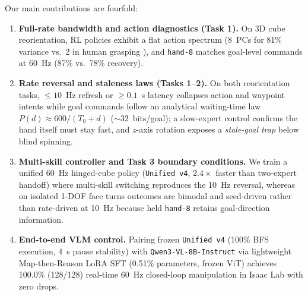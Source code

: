 Our main contributions are fourfold:
\begin{enumerate}[leftmargin=1.5em,itemsep=1.5pt,topsep=2pt]
  \item \textbf{Full-rate bandwidth and action diagnostics (Task 1).} On 3D cube reorientation, RL policies exhibit a flat action spectrum (8~PCs for 81\% variance vs.\ 2 in human grasping \citep{santello1998postural}), and \texttt{hand-8} matches goal-level commands at 60~Hz (87\% vs.\ 78\% recovery).
  \item \textbf{Rate reversal and staleness laws (Tasks 1--2).} On both reorientation tasks, $\le 10$~Hz refresh or $\ge 0.1$~s latency collapses action and waypoint intents while goal commands follow an analytical waiting-time law $P(d)\approx 600/(T_0+d)$ ($\sim 32$~bits/goal); a slow-expert control confirms the hand itself must stay fast, and $z$-axis rotation exposes a \emph{stale-goal trap} below blind spinning.
  \item \textbf{Multi-skill controller and Task 3 boundary conditions.} We train a unified 60~Hz hinged-cube policy (\texttt{Unified v4}, $2.4\times$ faster than two-expert handoff) where multi-skill switching reproduces the 10~Hz reversal, whereas on isolated 1-DOF face turns outcomes are bimodal and seed-driven rather than rate-driven at 10~Hz because held \texttt{hand-8} retains goal-direction information.
  \item \textbf{End-to-end VLM control.} Pairing frozen \texttt{Unified v4} (100\% BFS execution, 4~s pause stability) with \texttt{Qwen3-VL-8B-Instruct} via lightweight Map-then-Reason LoRA SFT (0.51\% parameters, frozen ViT) achieves 100.0\% (128/128) real-time 60~Hz closed-loop manipulation in Isaac Lab with zero drops.
\end{enumerate}
